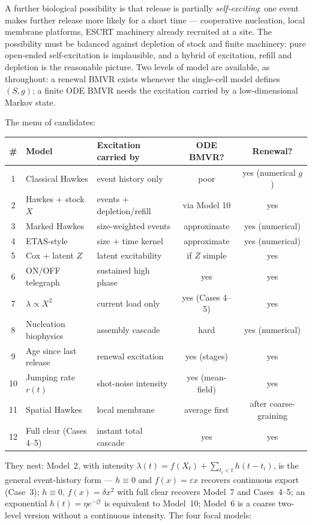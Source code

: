 A further biological possibility is that release is partially
\emph{self-exciting}: one event makes further release more likely for a
short time --- cooperative nucleation, local membrane platforms, ESCRT
machinery already recruited at a site. The possibility must be balanced
against depletion of stock and finite machinery: pure open-ended
self-excitation is implausible, and a hybrid of excitation, refill and
depletion is the reasonable picture. Two levels of model are available, as
throughout: a renewal BMVR exists whenever the single-cell model defines
$(S,g)$; a finite ODE BMVR needs the excitation carried by a
low-dimensional Markov state.

The menu of candidates:
\begin{center}
\renewcommand{\arraystretch}{1.15}
\small
\begin{tabular}{@{}clp{}cc@{}}
\toprule
\# & Model & Excitation carried by & ODE BMVR? & Renewal? \\
\midrule
1 & Classical Hawkes & event history only & poor & yes (numerical $g$) \\
2 & Hawkes + stock $X$ & events + depletion/refill & via Model 10 & yes \\
3 & Marked Hawkes & size-weighted events & approximate & yes (numerical) \\
4 & ETAS-style & size + time kernel & approximate & yes (numerical) \\
5 & Cox + latent $Z$ & latent excitability & if $Z$ simple & yes \\
6 & ON/OFF telegraph & sustained high phase & yes & yes \\
7 & $\lambda\propto X^2$ & current load only & yes (Cases 4--5) & yes \\
8 & Nucleation biophysics & assembly cascade & hard & yes (numerical) \\
9 & Age since last release & renewal excitation & yes (stages) & yes \\
10 & Jumping rate $r(t)$ & shot-noise intensity & yes (mean-field) & yes \\
11 & Spatial Hawkes & local membrane & average first & after coarse-graining \\
12 & Full clear (Cases 4--5) & instant total cascade & yes & yes \\
\bottomrule
\end{tabular}
\end{center}
They nest: Model~2, with intensity $\lambda(t)=f(X_t)+\sum_{t_i<t}h(t-t_i)$,
is the general event-history form --- $h\equiv0$ and $f(x)=\varepsilon x$
recovers continuous export (Case~3); $h\equiv0$, $f(x)=\delta x^2$ with
full clear recovers Model~7 and Cases~4--5; an exponential
$h(t)=\eta e^{-\zeta t}$ is equivalent to Model~10; Model~6 is a coarse
two-level version without a continuous intensity. The four focal models:

